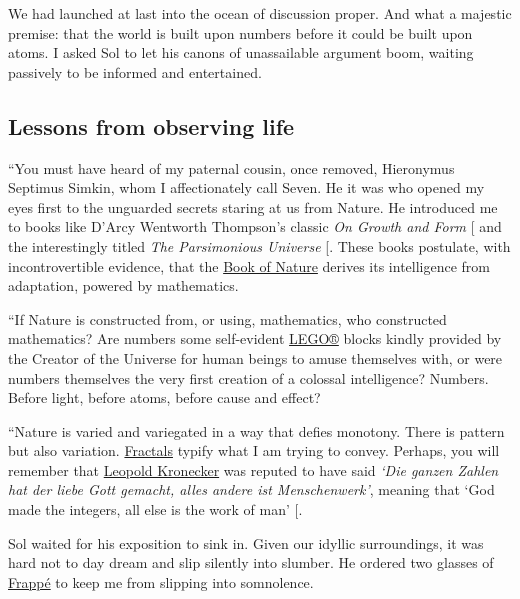 \documentclass[
  a4paper,
]{article}
\begin{document}
We had launched at last into the ocean of discussion proper. And what a
majestic premise: that the world is built upon numbers before it could
be built upon atoms. I asked Sol to let his canons of unassailable
argument boom, waiting passively to be informed and entertained.

\subsection{Lessons from observing
life}\label{lessons-from-observing-life}

``You must have heard of my paternal cousin, once removed, Hieronymus
Septimus Simkin, whom I affectionately call Seven. He it was who opened
my eyes first to the unguarded secrets staring at us from Nature. He
introduced me to books like D'Arcy Wentworth Thompson's classic \emph{On
Growth and Form} {[}\citeproc{ref-thompson-1992}{1}{]} and the
interestingly titled \emph{The Parsimonious Universe}
{[}\citeproc{ref-parsimonious-1996}{2}{]}. These books postulate, with
incontrovertible evidence, that the
\href{https://en.wikipedia.org/wiki/Book_of_Nature}{Book of Nature}
derives its intelligence from adaptation, powered by mathematics.

``If Nature is constructed from, or using, mathematics, who constructed
mathematics? Are numbers some self-evident
\href{https://www.lego.com/en-in?age-gate=grown_up}{LEGO®} blocks kindly
provided by the Creator of the Universe for human beings to amuse
themselves with, or were numbers themselves the very first creation of a
colossal intelligence? Numbers. Before light, before atoms, before cause
and effect?

``Nature is varied and variegated in a way that defies monotony. There
is pattern but also variation.
\href{https://www.treehugger.com/amazing-fractals-found-in-nature-4868776}{Fractals}
typify what I am trying to convey. Perhaps, you will remember that
\href{https://en.wikipedia.org/wiki/Leopold_Kronecker}{Leopold
Kronecker} was reputed to have said \emph{`Die ganzen Zahlen hat der
liebe Gott gemacht, alles andere ist Menschenwerk'}, meaning that `God
made the integers, all else is the work of man'
{[}\citeproc{ref-kronecker}{3}{]}.

Sol waited for his exposition to sink in. Given our idyllic
surroundings, it was hard not to day dream and slip silently into
slumber. He ordered two glasses of
\href{https://en.wikipedia.org/wiki/Frapp\%C3\%A9_coffee}{Frappé} to
keep me from slipping into somnolence.
\end{document}
